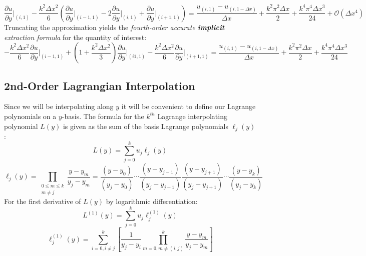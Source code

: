 \documentclass[10pt]{article}		%
\numberwithin{equation}{section}
\newcommand{\pder}[2]{\frac{\partial#1}{\partial#2}}			%
\begin{document}
\begin{equation}
\pder{u}{y}\Big|_{(i, 1)} - \frac{k^2 \Delta x^2}{6} \left(\pder{u}{y}\Big|_{(i-1, 1)} -2 \pder{u}{y}\Big|_{(i, 1)} + \pder{u}{y}\Big|_{(i+1, 1)}\right) = \frac{u_{(i, 1)} - u_{(i, 1-\Delta x)}}{\Delta x}  + \frac{k^2 \pi^2 \Delta x}{2} + \frac{k^4 \pi^4 \Delta x^3}{24} + \mathcal{O}(\Delta x^4)
\end{equation}
Truncating the approximation yields the \textit{fourth-order accurate \textbf{implicit} extraction formula} for the quantity of interest:
\begin{equation}
-\frac{k^2 \Delta x^2}{6} \pder{u}{y}\Big|_{(i-1, 1)} +\left(1+\frac{k^2 \Delta x^2}{3}\right)\pder{u}{y}\Big|_{(i1, 1)}-\frac{k^2 \Delta x^2}{6} \pder{u}{y}\Big|_{(i+1, 1)} = \frac{u_{(i, 1)} - u_{(i, 1-\Delta x)}}{\Delta x}  + \frac{k^2 \pi^2 \Delta x}{2} + \frac{k^4 \pi^4 \Delta x^3}{24}
\end{equation}

\newpage

\subsection{2nd-Order Lagrangian Interpolation}

Since we will be interpolating along $y$ it will be convenient to define our Lagrange polynomials on a $y$-basis. The formula for the $k^{th}$ Lagrange interpolating polynomial $L(y)$ is given as the sum of the basis Lagrange polynomials $\ell_j(y)$:
\begin{equation}
L(y) = \sum_{j=0}^{k} u_j \ell_j(y)
\end{equation}
\begin{equation}
\ell_j(y) = \prod_{\begin{smallmatrix}0\le m\le k\\ m\neq j\end{smallmatrix}} \frac{y-y_m}{y_j-y_m} = \frac{(y-y_0)}{(y_j-y_0)} \cdots \frac{(y-y_{j-1})}{(y_j-y_{j-1})} \frac{(y-y_{j+1})}{(y_j-y_{j+1})} \cdots \frac{(y-y_k)}{(y_j-y_k)}
\end{equation}
For the first derivative of $L(y)$ by logarithmic differentiation:
\begin{equation}
L^{(1)}(y) = \sum_{j=0}^{k} u_j \ell_j^{(1)}(y)
\end{equation}
\begin{equation}
\ell_j^{(1)}(y) = \sum_{i=0, i\not=j}^k \left[ \frac{1}{y_j-y_i}\prod_{m=0,m\not = (i , j)}^k \frac{y-y_m}{y_j-y_m} \right]
\end{equation}
\end{document}
